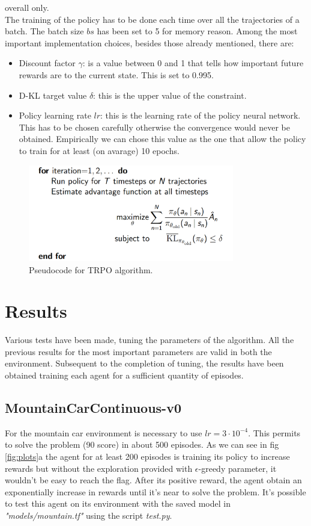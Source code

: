 \documentclass[11pt]{article}
\begin{document}
overall only.
\\
The training of the policy has to be done each time over all the trajectories of a batch.
The batch size $bs$ has been set to 5 for memory reason.
Among the most important implementation choices, besides those already mentioned, there are:
\begin{itemize}
        \item Discount factor $\gamma$: is a value between 0 and 1 that tells how
        important future rewards are to the current state. This is set to 0.995.
        \item D-KL target value $\delta$: this is the upper value of the constraint.
        \item Policy learning rate $lr$: this is the learning rate of the policy neural
        network. This has to be chosen carefully otherwise the convergence would never be
        obtained. Empirically we can chose this value as the one that allow the policy to
        train for at least (on avarage) 10 epochs.
\end{itemize}


\begin{figure}[t]
        \includegraphics[width=9cm]{pseudocode}
        \centering
        \caption{Pseudocode for TRPO algorithm.}
        \label{fig:pseudocode}
\end{figure}

\section{Results}
Various tests have been made, tuning the parameters of the algorithm. All the previous
results for the most important parameters are valid in both the environment. Subsequent to
the completion of tuning, the results have been obtained training each agent for a
sufficient quantity of episodes. 
\subsection{MountainCarContinuous-v0}
For the mountain car environment is necessary to use $lr = 3 \cdot 10^{-4}$. This permits
to solve the problem (90 score) in about 500 episodes. As we can see in fig
\ref{fig:plots}a the agent for at least 200 episodes is training its policy to increase
rewards but without the exploration provided with $\epsilon$-greedy parameter, it wouldn't
be easy to reach the flag. After its positive reward, the agent obtain an exponentially
increase in rewards until it's near to solve the problem. 
It's possible to test this agent on its environment with the saved model in
\textit{"models/mountain.tf"} using the script \textit{test.py}.
\end{document}
